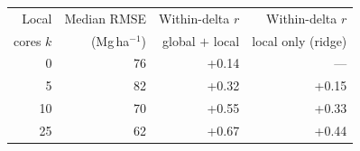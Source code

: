 \begin{tabular}{rrrr}
\toprule
Local & Median RMSE & Within-delta $r$ & Within-delta $r$ \\
cores $k$ & (Mg\,ha$^{-1}$) & global $+$ local & local only (ridge) \\
\midrule
0 & 76 & +0.14 & --- \\
5 & 82 & +0.32 & +0.15 \\
10 & 70 & +0.55 & +0.33 \\
25 & 62 & +0.67 & +0.44 \\
\bottomrule
\end{tabular}
